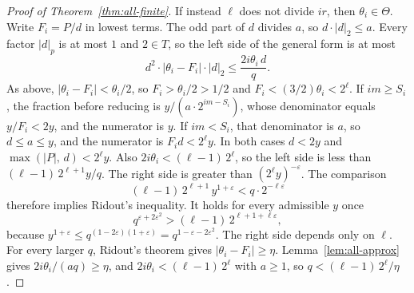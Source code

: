 \documentclass[11pt]{article}
\begin{document}
\begin{proof}[Proof of Theorem~\ref{thm:all-finite}]
If instead $\ell$ does not divide $ir$, then $\theta_i \in \Theta$.
Write $F_i = P/d$ in lowest terms.
The odd part of $d$ divides $a$, so $d \cdot \lvert d \rvert_2 \le a$.
Every factor $\lvert d \rvert_p$ is at most $1$ and $2 \in T$, so the left side of the general form is at most
\[
d^2 \cdot \lvert \theta_i - F_i \rvert \cdot \lvert d \rvert_2 \le \frac{2i\theta_i\, d}{q}.
\]
As above, $\lvert \theta_i - F_i \rvert < \theta_i/2$, so $F_i > \theta_i/2 > 1/2$ and $F_i < (3/2)\theta_i < 2^\ell$.
If $im \ge S_i$, the fraction before reducing is $y/(a \cdot 2^{im-S_i})$, whose denominator equals $y/F_i < 2y$, and the numerator is $y$.
If $im < S_i$, that denominator is $a$, so $d \le a \le y$, and the numerator is $F_i d < 2^\ell y$.
In both cases $d < 2y$ and $\max(\lvert P \rvert,\, d) < 2^\ell y$.
Also $2i\theta_i < (\ell-1)\, 2^\ell$, so the left side is less than $(\ell-1)\, 2^{\ell+1} y/q$.
The right side is greater than $(2^\ell y)^{-\varepsilon}$.
The comparison
\[
(\ell-1)\, 2^{\ell+1}\, y^{1+\varepsilon} < q \cdot 2^{-\ell\varepsilon}
\]
therefore implies Ridout's inequality.
It holds for every admissible $y$ once
\[
q^{\varepsilon + 2\varepsilon^2} > (\ell-1)\, 2^{\ell + 1 + \ell\varepsilon},
\]
because $y^{1+\varepsilon} \le q^{(1-2\varepsilon)(1+\varepsilon)} = q^{1 - \varepsilon - 2\varepsilon^2}$.
The right side depends only on $\ell$.
For every larger $q$, Ridout's theorem gives $\lvert \theta_i - F_i \rvert \ge \eta$.
Lemma~\ref{lem:all-approx} gives $2i\theta_i/(aq) \ge \eta$, and $2i\theta_i < (\ell-1)\, 2^\ell$ with $a \ge 1$, so $q < (\ell-1)\, 2^\ell/\eta$.


\end{proof}
\end{document}
